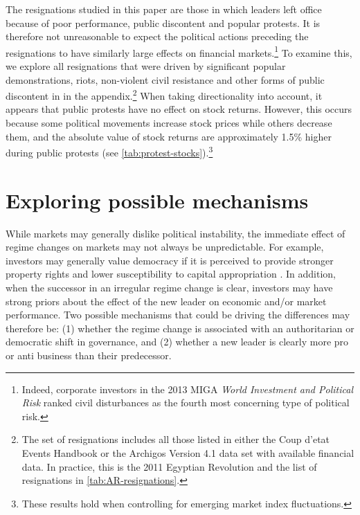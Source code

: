 \documentclass[12pt,final,fleqn]{article}
\theoremstyle{plain}
\begin{document}
The resignations studied in this paper are those in which leaders left office because of poor performance, public discontent and popular protests. It is therefore not unreasonable to expect the political actions preceding the resignations to have similarly large effects on financial markets.\footnote{Indeed, corporate investors in the 2013 MIGA \textit{World Investment and Political Risk} ranked civil disturbances as the fourth most concerning type of political risk.} To examine this, we explore all resignations that were driven by significant popular demonstrations, riots, non-violent civil resistance and other forms of public discontent in  in the appendix.\footnote{The set of resignations includes all those listed in either the Coup d'etat Events Handbook or the Archigos Version 4.1 data set with available financial data. In practice, this is the 2011 Egyptian Revolution and the list of resignations in \autoref{tab:AR-resignations}.} When taking directionality into account, it appears that public protests have no effect on stock returns. However, this occurs because some political movements increase stock prices while others decrease them, and the absolute value of stock returns are approximately 1.5\% higher during public protests (see \autoref{tab:protest-stocks}).\footnote{These results hold when controlling for emerging market index fluctuations.}


\section{Exploring possible mechanisms} \label{subsec: mechanisms} 

While markets may generally dislike political instability, the immediate effect of regime changes on markets may not always be unpredictable. For example, investors may generally value democracy if it is perceived to provide stronger property rights and lower susceptibility to capital appropriation \citep{przeworski1982structure, north1989constitutions, svensson1998investment}. In addition, when the successor in an irregular regime change is clear, investors may have strong priors about the effect of the new leader on economic and/or market performance. Two possible mechanisms that could be driving the differences may therefore be: (1) whether the regime change is associated with an authoritarian or democratic shift in governance, and (2) whether a new leader is clearly more pro or anti business than their predecessor. 
\end{document}
